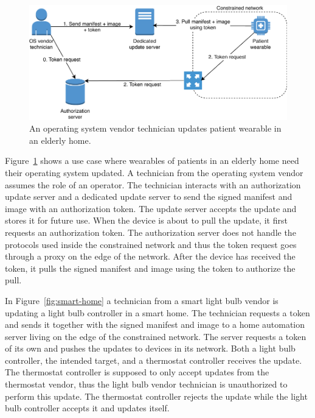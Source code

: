 \documentclass[0-thesis.tex]{subfiles}
\begin{document}
\begin{figure}[t]
    \caption{An operating system vendor technician updates patient wearable in an elderly home.}
    \label{fig:elderly-home}
    \includegraphics{images/use-case-elderly-home.pdf}
\end{figure}

Figure~\ref{fig:elderly-home} shows a use case where wearables of patients in an elderly
home need their operating system updated. A technician from the operating system vendor
assumes the role of an operator. The technician interacts with an authorization update
server and a dedicated update server to send the signed manifest and image with an
authorization token. The update server accepts the update and stores it for future use.
When the device is about to pull the update, it first requests an authorization token. The
authorization server does not handle the protocols used inside the constrained network and
thus the token request goes through a proxy on the edge of the network. After the device
has received the token, it pulls the signed manifest and image using the token to
authorize the pull.

In Figure~\ref{fig:smart-home} a technician from a smart light bulb vendor is updating a
light bulb controller in a smart home. The technician requests a token and sends it
together with the signed manifest and image to a home automation server living on the edge
of the constrained network. The server requests a token of its own and pushes the updates
to devices in its network. Both a light bulb controller, the intended target, and a
thermostat controller receives the update. The thermostat controller is supposed to only
accept updates from the thermostat vendor, thus the light bulb vendor technician is
unauthorized to perform this update. The thermostat controller rejects the update while
the light bulb controller accepts it and updates itself.
\end{document}
